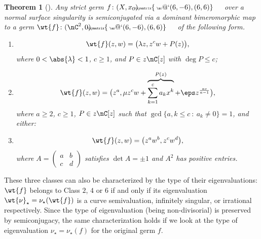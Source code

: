 \documentclass[11 pt, twoside, a4paper]{amsart}
\makeatletter
\newcommand{\selfarrow}[1][]{\tiny{\!\!\!\xymatrix{\phantom{|}\ar@`{(6,-6),(6,6)}}\hspace{4mm}}}
\newtheorem{thm}{Theorem}[section]
\theoremstyle{definition}
\theoremstyle{definition}
\makeatother
\begin{document}
\begin{thm}[{\cite[Proposition 1.5 and Table II]{favre:rigidgerms}}]\label{thm:strictFclass}
Any strict germ $f \colon (X,x_0) \selfarrow$ over a normal surface singularity is semiconjugated via a dominant bimeromorphic map to a germ $\wt{f} \colon (\nC^2,0) \selfarrow$ of the following form.
\begin{enumerate}
\item[Class 2:]\[\wt{f}(z,w)=\big(\lambda z, z^c w + P(z)\big)\text{,}\]\vspace{2mm}
where $0 < \abs{\lambda} < 1$, $c \geq 1$, and $P \in z\nC[z]$ with $\deg P \leq c$;  
\item[Class 4:] \[\wt{f}(z,w)=\big(z^a, \mu z^c w + \overbrace{\sum_{k=1}^c a_k x^k}^{P(z)} + \eps z^{\frac{ac}{a-1}}\big)\text{,}\]\vspace{2mm}
where $a \geq 2$, $c \geq 1$, $P\in z \nC[z]$ such that $\gcd\{a, k \leq c\ : \ a_k \neq 0\} = 1$, and either:
\item[Class 6:] \[\wt{f}(z,w)=\big(z^a w^b, z^c w^d\big)\text{,}\]\vspace{2mm}
where $A=\begin{pmatrix}a & b \\ c & d\end{pmatrix}$ satisfies $\det A = \pm 1$ and $A^2$ has positive entries. 
\end{enumerate}
\end{thm}
These three classes can also be characterized by the type of their eigenvaluations: $\wt{f}$ belongs to Class $2$, $4$ or $6$ if and only if its eigenvaluation $\wt{\nu}_\star=\nu_\star(\wt{f})$ is a curve semivaluation, infinitely singular, or irrational respectively.
Since the type of eigenvaluation (being non-divisorial) is preserved by semiconjugacy, the same characterization holds if we look at the type of eigenvaluation $\nu_\star =\nu_\star(f)$ for the original germ $f$.
\end{document}
